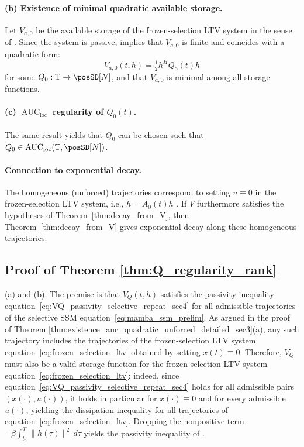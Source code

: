 \documentclass[10pt]{article} %
\def\eqref#1{equation~\ref{#1}}
\newcommand{\timeInt}{\mathbb T}                        %
\newcommand{\loc}{\mathrm{loc}}                         %
\DeclareMathOperator{\AUC}{AUC}                         %
\theoremstyle{definition}
\begin{document}
\paragraph{(b) Existence of minimal quadratic available storage.}
Let $V_{a,0}$ be the available storage of the frozen-selection LTV system in the sense of \citet[Def.~4.1]{MorandinHinsen2024}.
Since the system is passive, \citet[Cor.~4.3]{MorandinHinsen2024} implies that $V_{a,0}$ is finite and coincides with a quadratic form:
\[
V_{a,0}(t,h)=\tfrac12 h^H Q_0(t)h
\]
for some $Q_0:\timeInt\to \posSD[N]$, and that $V_{a,0}$ is minimal among all storage functions.

\paragraph{(c) $\AUC_{\loc}$ regularity of $Q_0(t)$.}
The same result \citet[Cor.~4.3]{MorandinHinsen2024} yields that $Q_0$ can be chosen such that $Q_0\in \AUC_{\loc}(\timeInt,\posSD[N])$.

\paragraph{Connection to exponential decay.}
The homogeneous (unforced) trajectories correspond to setting $u\equiv 0$ in the frozen-selection LTV system, i.e., $\dot{h}=A_0(t)h$ \citep[Sec.~2.1]{MorandinHinsen2024}. If $V$ furthermore satisfies the hypotheses of Theorem~\ref{thm:decay_from_V}, then Theorem~\ref{thm:decay_from_V} gives exponential decay along these homogeneous trajectories.

\subsection{Proof of Theorem \ref{thm:Q_regularity_rank}}
\label{subsec:reg_rank_universal_q_storage}
(a) and (b): The premise is that $V_Q(t,h)$ satisfies the passivity inequality \eqref{eq:VQ_passivity_selective_repeat_sec4} for all admissible trajectories of the selective SSM \eqref{eq:mamba_ssm_prelim}. As argued in the proof of Theorem \ref{thm:existence_auc_quadratic_unforced_detailed_sec3}(a), any such trajectory includes the trajectories of the frozen-selection LTV system \eqref{eq:frozen_selection_ltv} obtained by setting $x(t) \equiv 0$. Therefore, $V_Q$ must also be a valid storage function for the frozen-selection LTV system \eqref{eq:frozen_selection_ltv}: indeed, since \eqref{eq:VQ_passivity_selective_repeat_sec4} holds for all admissible pairs $(x(\cdot),u(\cdot))$, it holds in particular for $x(\cdot)\equiv 0$ and for every admissible $u(\cdot)$, yielding the dissipation inequality for all trajectories of \eqref{eq:frozen_selection_ltv}. Dropping the nonpositive term $-\beta\int_{t_0}^{T}\|h(\tau)\|^2\,d\tau$ yields the passivity inequality of \citet[Def.~1.1]{MorandinHinsen2024}.
\end{document}
